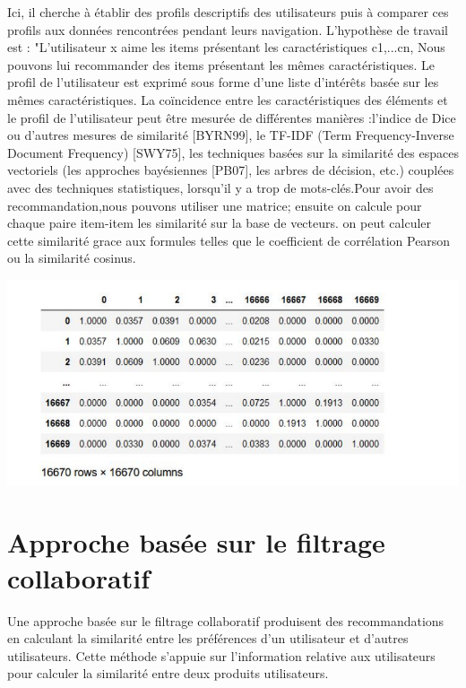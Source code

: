 \documentclass[12pt,a4paper]{article}
\begin{document}
Ici, il cherche à établir des profils descriptifs des utilisateurs puis à comparer ces profils aux données rencontrées pendant leurs navigation. L'hypothèse de travail est : "L'utilisateur x aime les items présentant les caractéristiques {c1,...cn}, Nous pouvons lui recommander des items présentant les mêmes caractéristiques. Le profil de l'utilisateur est exprimé sous forme d’une liste d’intérêts basée sur les mêmes caractéristiques. La coïncidence entre les caractéristiques des éléments et le profil de l'utilisateur peut être mesurée de différentes manières :l’indice de Dice ou d’autres mesures de similarité [BYRN99],
le TF-IDF (Term Frequency-Inverse Document Frequency) [SWY75],
les techniques basées sur la similarité des espaces vectoriels (les approches bayésiennes [PB07], les arbres de décision, etc.) couplées avec des techniques statistiques, lorsqu’il y a trop de mots-clés.Pour avoir des recommandation,nous pouvons utiliser une matrice; ensuite on calcule pour chaque paire item-item les similarité sur la base de vecteurs. on peut calculer cette similarité grace aux formules telles que le coefficient de corrélation Pearson ou la similarité cosinus. 


\includegraphics[width=1\linewidth]{Capture 4}




\section{Approche basée sur le filtrage collaboratif }	
Une approche basée sur le filtrage collaboratif produisent des recommandations en calculant la similarité entre les préférences d'un utilisateur et d'autres utilisateurs. Cette méthode s'appuie sur l'information relative aux utilisateurs pour calculer la similarité entre deux produits utilisateurs.
\end{document}
